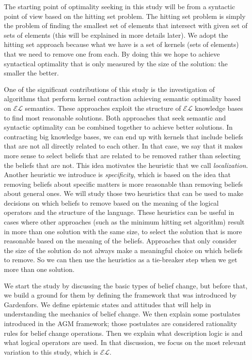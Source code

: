 The starting point of optimality seeking in this study will be from a syntactic point of view based on the hitting set problem. The hitting set problem is simply the problem of finding the smallest set of elements that intersect with given set of sets of elements (this will be explained in more details later). We adopt the hitting set approach because what we have is a set of kernels (sets of elements) that we need to remove one from each. By doing this we hope to achieve syntactical optimality that is only measured by the size of the solution: the smaller the better. 

One of the significant contributions of this study is the investigation of algorithms that perform kernel contraction achieving semantic optimality based on $\mathcal{EL}$ semantics. These approaches exploit the structure of $\mathcal{EL}$ knowledge bases to find most reasonable solutions. Both approaches that seek semantic and syntactic optimality can be combined together to achieve better solutions. In contracting big knowledge bases, we can end up with kernels that include beliefs that are not all directly related to each other. In that case, we say that it makes more sense to select beliefs that are related to be removed rather than selecting the beliefs that are not. This idea motivates the heuristic that we call \textit{localization}. Another heuristic we introduce is \textit{specificity}, which is based on the idea that removing beliefs about specific matters is more reasonable than removing beliefs about general ones. We will study those two heuristics that can be used to make decisions on which beliefs to remove based on the meaning of the logical operators and the structure of the language. These heuristics can be useful in cases where other approaches (such as the minimum hitting set algorithm) result in more than one solution with the same size, to select the solution that is more reasonable based on the meaning of the beliefs. Approaches that only consider the size of the solution do not always make a meaningful choice on which beliefs to remove. So we can then use the heuristics as a tie-breaker step when we get more than one solution.

We start the study by discussing the basic types of belief change, but before that, we build a ground for them by defining the framework that was introduced by Gardenfors. We define epistemic states and attitudes that will help in understanding the mechanics of belief change. We then explain some postulates introduced in the AGM framework; those postulates are considered rationality rules for belief change operations. Then we explain what description logic is and what logical operators are used. In that discussion, we focus on the most relevant variation to this study, which is $\mathcal{EL}$. 

